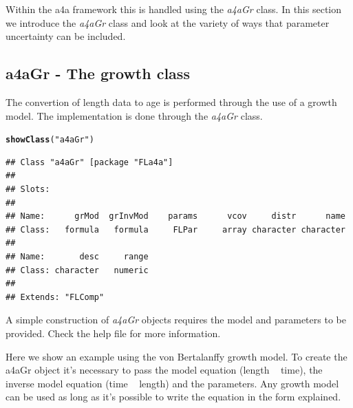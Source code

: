 \documentclass[a4paper,english,10pt]{article}\usepackage[]{graphicx}\usepackage[]{color}
\makeatletter
\newcommand{\hlstr}[1]{\textcolor[rgb]{0.192,0.494,0.8}{#1}}%
\newcommand{\hlstd}[1]{\textcolor[rgb]{0.345,0.345,0.345}{#1}}%
\newcommand{\hlkwd}[1]{\textcolor[rgb]{0.737,0.353,0.396}{\textbf{#1}}}%
\newenvironment{kframe}{%
 \def\at@end@of@kframe{}%
 \ifinner\ifhmode%
  \def\at@end@of@kframe{\end{minipage}}%
  \begin{minipage}{\columnwidth}%
 \fi\fi%
 \def\FrameCommand##1{\hskip\@totalleftmargin \hskip-\fboxsep
 \colorbox{shadecolor}{##1}\hskip-\fboxsep
     \hskip-\linewidth \hskip-\@totalleftmargin \hskip\columnwidth}%
 \MakeFramed {\advance\hsize-\width
   \@totalleftmargin\z@ \linewidth\hsize
   \@setminipage}}%
 {\par\unskip\endMakeFramed%
 \at@end@of@kframe}
\newenvironment{knitrout}{}{} %
\newcommand{\class}[1]{{\textit{#1}}}
\makeatother
\begin{document}
Within the a4a framework this is handled using the \class{a4aGr} class. In this section we introduce the \class{a4aGr} class and look at the variety of ways that parameter uncertainty can be included.

\subsection{a4aGr - The growth class}

The convertion of length data to age is performed through the use of a growth model. The implementation is done through the \class{a4aGr} class.

\begin{knitrout}
\color{fgcolor}\begin{kframe}
\begin{alltt}
\hlkwd{showClass}\hlstd{(}\hlstr{"a4aGr"}\hlstd{)}
\end{alltt}
\begin{verbatim}
## Class "a4aGr" [package "FLa4a"]
## 
## Slots:
##                                                                   
## Name:      grMod  grInvMod    params      vcov     distr      name
## Class:   formula   formula     FLPar     array character character
##                           
## Name:       desc     range
## Class: character   numeric
## 
## Extends: "FLComp"
\end{verbatim}
\end{kframe}
\end{knitrout}


A simple construction of \class{a4aGr} objects requires the model and parameters to be provided.
Check the help file for more information.

Here we show an example using the von Bertalanffy growth model. To create the a4aGr object it's necessary to pass the model equation (length ~ time), the inverse model equation (time ~ length) and the parameters. Any growth model can be used as long as it's possible to write the equation in the form explained.
\end{document}
